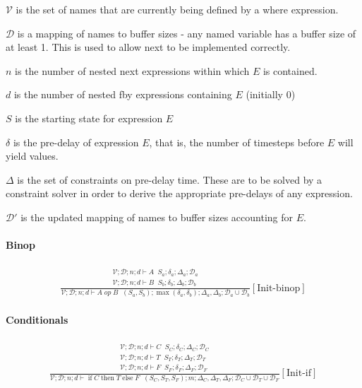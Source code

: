 \documentclass{scrartcl}
\DeclareMathOperator{\ifop}{if}
\DeclareMathOperator{\thenop}{then}
\DeclareMathOperator{\elseop}{else}
\DeclareMathOperator{\initrel}{\overset{init}{\Rightarrow}}
\begin{document}
    $\mathcal{V}$ is the set of names that are currently being defined by a where expression.
    
    $\mathcal{D}$ is a mapping of names to buffer sizes - any named variable has a buffer size of at least 1. This is used to allow next to be implemented correctly.
    
    $n$ is the number of nested next expressions within which $E$ is contained.
    
    $d$ is the number of nested fby expressions containing $E$ (initially 0)
    
    $S$ is the starting state for expression $E$
    
    $\delta$ is the pre-delay of expression $E$, that is, the number of timesteps before $E$ will yield values.
    
    $\Delta$ is the set of constraints on pre-delay time. These are to be solved by a constraint solver in order to derive the appropriate pre-delays of any expression.
    
    $\mathcal{D}'$ is the updated mapping of names to buffer sizes accounting for $E$.
    
    \paragraph{Binop}
    
    \begin{align*}
    \frac{
        \begin{matrix}
        \mathcal{V}; \mathcal{D}; n; d \vdash A \initrel S_a; \delta_a; \Delta_a; \mathcal{D}_a \\
        \mathcal{V}; \mathcal{D}; n; d \vdash B \initrel S_b; \delta_b; \Delta_b; \mathcal{D}_b
        \end{matrix}
    }{
        \mathcal{V}; \mathcal{D}; n; d \vdash A \; op \; B \initrel (S_a, S_b); \max(\delta_a, \delta_b); \Delta_a, \Delta_b; \mathcal{D}_a \cup \mathcal{D}_b
    }[\text{Init-binop}]
    \end{align*}
    
    \paragraph{Conditionals}
    
    \begin{align*}
    \frac{
        \begin{matrix}
        \mathcal{V}; \mathcal{D}; n; d \vdash C \initrel S_C; \delta_C; \Delta_C; \mathcal{D}_C \\
        \mathcal{V}; \mathcal{D}; n; d \vdash T \initrel S_T; \delta_T; \Delta_T; \mathcal{D}_T \\
        \mathcal{V}; \mathcal{D}; n; d \vdash F \initrel S_F; \delta_F; \Delta_F; \mathcal{D}_F
        \end{matrix}
    }{
        \mathcal{V}; \mathcal{D}; n; d \vdash \ifop C \thenop T \elseop F \initrel (S_C, S_T, S_F); m; \Delta_C, \Delta_T, \Delta_F; \mathcal{D}_C \cup \mathcal{D}_T \cup \mathcal{D}_F
    }[\text{Init-if}]
    \end{align*}
    
\end{document}
